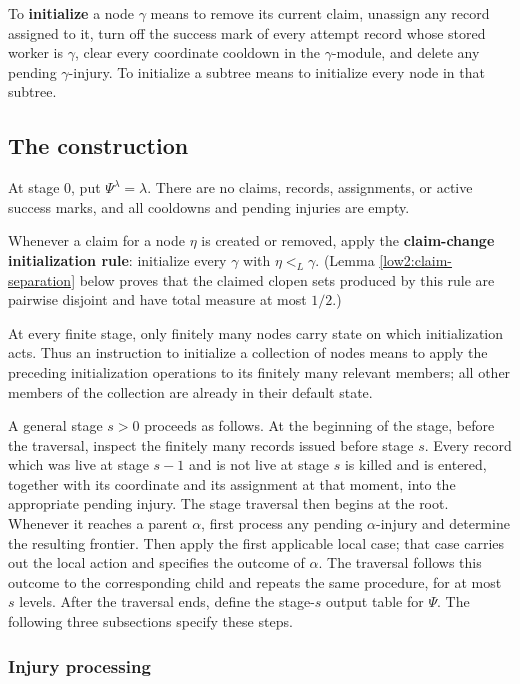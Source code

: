 \documentclass[10pt,a4paper]{amsart}
\begin{document}
To \textbf{initialize} a node $\gamma$ means to remove its current claim,
unassign any record assigned to it, turn off the success mark of every attempt
record whose stored worker is $\gamma$, clear every coordinate cooldown in the
$\gamma$-module, and delete any pending $\gamma$-injury. To initialize a
subtree means to initialize every node in that subtree.

\subsection{The construction}

At stage $0$, put $\Psi^\lambda=\lambda$. There are no claims, records,
assignments, or active success marks, and all cooldowns and pending injuries
are empty.

Whenever a claim for a node $\eta$ is created or removed, apply the
\textbf{claim-change initialization rule}: initialize every $\gamma$ with
$\eta<_L\gamma$. (Lemma \ref{low2:claim-separation} below proves that the
claimed clopen sets produced by this rule are pairwise disjoint and have total
measure at most $1/2$.)

At every finite stage, only finitely many nodes carry state on which
initialization acts. Thus an instruction to initialize a collection of nodes
means to apply the preceding initialization operations to its finitely many
relevant members; all other members of the collection are already in their
default state.

A general stage $s>0$ proceeds as follows. At the beginning of the stage,
before the traversal, inspect the finitely many records issued before stage
$s$. Every record which was live at stage $s-1$ and is not live at stage $s$
is killed and is entered, together with its coordinate and its assignment at
that moment, into the appropriate pending injury. The stage traversal then
begins at the root. Whenever it reaches a parent $\alpha$, first process any
pending $\alpha$-injury and determine the resulting frontier. Then apply the
first applicable local case; that case carries out the local action and
specifies the outcome of $\alpha$. The traversal follows this outcome to the
corresponding child and repeats the same procedure, for at most $s$ levels.
After the traversal ends, define the stage-$s$ output table for $\Psi$. The
following three subsections specify these steps.

\subsubsection{Injury processing}
\end{document}
